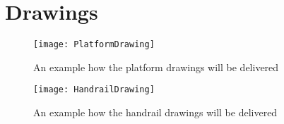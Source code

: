 \section{Drawings}

\begin{figure}[H]
\centering
\texttt{[image: PlatformDrawing]}
\caption{An example how the platform drawings will be delivered}\label{fig:PlatformDrawing}
\end{figure}

\begin{figure}
\centering
\texttt{[image: HandrailDrawing]}
\caption{An example how the handrail drawings will be delivered}\label{fig:HandrailDrawing}
\end{figure}